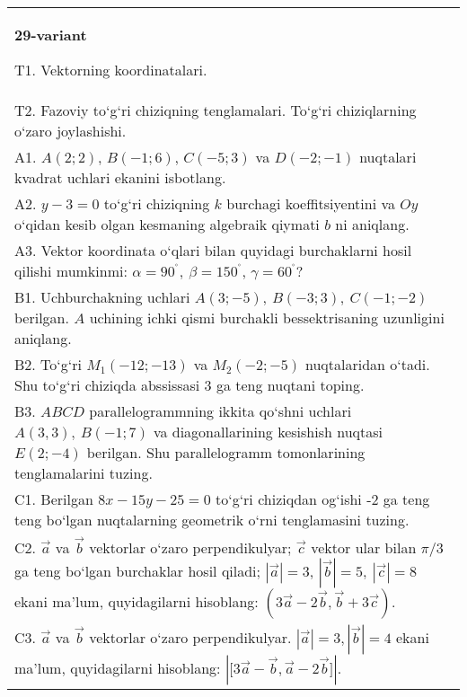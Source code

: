 \documentclass{article}
\begin{document}
\begin{tabular}{m{17cm}}
\textbf{29-variant}

T1. 
Vektorning koordinatalari.
 \\
T2. 
Fazoviy to‘g‘ri chiziqning tenglamalari. To‘g‘ri chiziqlarning o‘zaro joylashishi.
 \\
A1. 
$A (2;2) $, $B (-1;6) $, $C (-5;3) $ va $D (-2;-1) $
nuqtalari kvadrat uchlari ekanini isbotlang.
 \\
A2. 
$y-3=0$ to‘g‘ri chiziqning $k$ burchagi
koeffitsiyentini va $Oy$ o‘qidan kesib olgan kesmaning algebraik
qiymati $b$ ni aniqlang.
 \\
A3. 
Vektor koordinata o‘qlari bilan quyidagi burchaklarni hosil qilishi
mumkinmi: $\alpha = 90^{{^\circ}},\ \beta = 150^{{^\circ}}$,
$\gamma = 60^{{^\circ}}?$
 \\
B1. 
Uchburchakning uchlari
\(A (3;-5),\ B (-3;3),\ C (-1;-2) \) berilgan. $A$ uchining ichki qismi
burchakli bessektrisaning uzunligini aniqlang.
 \\
B2. 
To‘g‘ri \(M_{1} (-12;-13) \) va \(M_{2} (-2;-5) \)
nuqtalaridan o‘tadi. Shu to‘g‘ri chiziqda abssissasi 3 ga teng nuqtani toping.
 \\
B3. 
$ABCD$ parallelogrammning ikkita qo‘shni uchlari
\(A (3,3),\ B (-1;7) \) va diagonallarining kesishish nuqtasi
\(E (2;-4) \) berilgan. Shu parallelogramm tomonlarining tenglamalarini
tuzing.
 \\
C1. 
Berilgan \(8x-15y-25=0\) to‘g‘ri chiziqdan og‘ishi -2 ga teng
teng bo‘lgan nuqtalarning geometrik o‘rni tenglamasini tuzing.
 \\
C2. 
$\vec{a}$ va $\vec{b}$ vektorlar o‘zaro perpendikulyar; $\vec{c}$ vektor ular bilan $\pi/3$ ga teng bo‘lgan burchaklar hosil qiladi; $|\vec{a}| = 3$, $|\vec{b}| = 5,\ |\vec{c}| = 8$ ekani ma’lum, quyidagilarni hisoblang:
$\left(3\vec{a} - 2\vec{b},\vec{b} + 3\vec{c} \right) $.
 \\
C3. 
$\vec{a}$ va $\vec{b}$ vektorlar o‘zaro perpendikulyar. $|\vec{a}| = 3,|\vec{b}| = 4$ ekani ma’lum, quyidagilarni hisoblang:
$|\lbrack 3\vec{a} - \vec{b},\vec{a}-2\vec{b}\rbrack|$.
 \\

\end{tabular}
\vspace{1cm}
\end{document}
